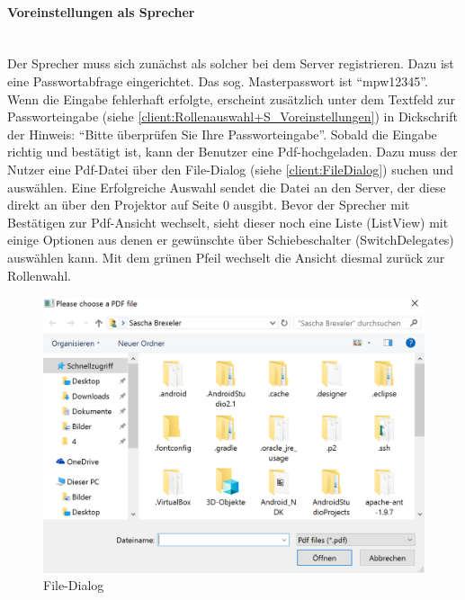 \paragraph{Voreinstellungen als Sprecher}$\;$\\
Der Sprecher muss sich zunächst als solcher bei dem Server registrieren. Dazu ist eine Passwortabfrage eingerichtet. Das sog. Masterpasswort ist "`mpw12345"'. Wenn die Eingabe fehlerhaft erfolgte, erscheint zusätzlich unter dem Textfeld zur Passworteingabe (siehe \autoref{client:Rollenauswahl+S_Voreinstellungen}) in Dickschrift der Hinweis: "`Bitte überprüfen Sie Ihre Passworteingabe"'. Sobald die Eingabe richtig und bestätigt ist, kann der Benutzer eine Pdf-hochgeladen. Dazu muss der Nutzer eine Pdf-Datei über den File-Dialog (siehe \autoref{client:FileDialog}) suchen und auswählen. Eine Erfolgreiche Auswahl sendet die Datei an den Server, der diese direkt an über den Projektor auf Seite 0 ausgibt. Bevor der Sprecher mit Bestätigen zur Pdf-Ansicht wechselt, sieht dieser noch eine Liste (ListView) mit einige Optionen aus denen er gewünschte über Schiebeschalter (SwitchDelegates) auswählen kann. Mit dem grünen Pfeil wechselt die Ansicht diesmal zurück zur Rollenwahl.

\begin{figure}[ht!]
	\centering
	\includegraphics[scale=0.7]{GUI/Bilder/3_S_4_Voreinstellung.PNG}
	\caption{File-Dialog{\tiny}}
	\label{client:FileDialog}
\end{figure}

